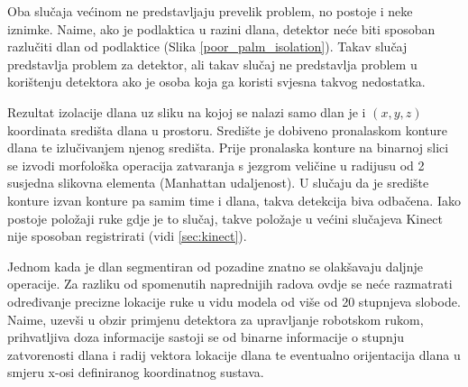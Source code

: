 \documentclass[times, utf8, diplomski, numeric]{fer}
\begin{document}
Oba slučaja većinom ne predstavljaju prevelik problem, no postoje i neke iznimke. Naime, ako je podlaktica u razini dlana, detektor neće biti sposoban razlučiti dlan od podlaktice (Slika \ref{poor_palm_isolation}). Takav slučaj predstavlja problem za detektor, ali takav slučaj ne predstavlja problem u korištenju detektora ako je osoba koja ga koristi svjesna takvog nedostatka.

Rezultat izolacije dlana uz sliku na kojoj se nalazi samo dlan je i $(x,y,z)$ koordinata središta dlana u prostoru. Središte je dobiveno pronalaskom konture dlana te izlučivanjem njenog središta. Prije pronalaska konture na binarnoj slici se izvodi morfološka operacija zatvaranja s jezgrom veličine u radijusu od 2 susjedna slikovna elementa (Manhattan udaljenost). U slučaju da je središte konture izvan konture pa samim time i dlana, takva detekcija biva odbačena. Iako postoje položaji ruke gdje je to slučaj, takve položaje u većini slučajeva Kinect nije sposoban registrirati (vidi \ref{sec:kinect}).

Jednom kada je dlan segmentiran od pozadine znatno se olakšavaju daljnje operacije. Za razliku od spomenutih naprednijih radova ovdje se neće razmatrati određivanje precizne lokacije ruke u vidu modela od više od 20 stupnjeva slobode. Naime, uzevši u obzir primjenu detektora za upravljanje robotskom rukom, prihvatljiva doza informacije sastoji se od binarne informacije o stupnju zatvorenosti dlana i radij vektora lokacije dlana te eventualno orijentacija dlana u smjeru x-osi definiranog koordinatnog sustava.
\end{document}
